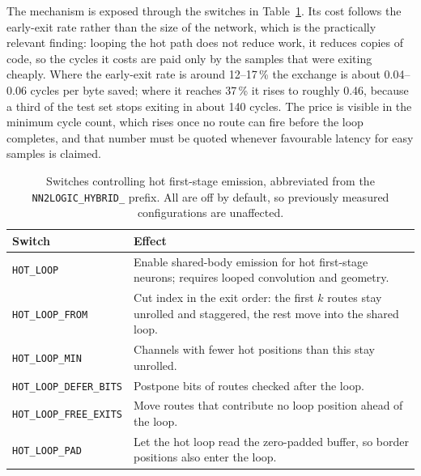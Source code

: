 The mechanism is exposed through the switches in Table~\ref{tab:impl-hotloop}.
Its cost follows the early-exit rate rather than the size of the network, which is the practically relevant finding: looping the hot path does not reduce work, it reduces copies of code, so the cycles it costs are paid only by the samples that were exiting cheaply.
Where the early-exit rate is around 12--17\,\% the exchange is about 0.04--0.06 cycles per byte saved; where it reaches 37\,\% it rises to roughly 0.46, because a third of the test set stops exiting in about 140 cycles.
The price is visible in the minimum cycle count, which rises once no route can fire before the loop completes, and that number must be quoted whenever favourable latency for easy samples is claimed.

\begin{table}[H]
	\centering
	\small
	\caption{Switches controlling hot first-stage emission, abbreviated from the \texttt{NN2LOGIC\_HYBRID\_} prefix.
		All are off by default, so previously measured configurations are unaffected.}
	\label{tab:impl-hotloop}
	\begin{tabularx}{\textwidth}{@{}>{\raggedright\arraybackslash}p{}X@{}}
		\toprule
		\textbf{Switch} & \textbf{Effect} \\
		\midrule
		\texttt{HOT\_LOOP} & Enable shared-body emission for hot first-stage neurons; requires looped convolution and geometry. \\
		\texttt{HOT\_LOOP\_FROM} & Cut index in the exit order: the first \(k\) routes stay unrolled and staggered, the rest move into the shared loop. \\
		\texttt{HOT\_LOOP\_MIN} & Channels with fewer hot positions than this stay unrolled. \\
		\texttt{HOT\_LOOP\_DEFER\_BITS} & Postpone bits of routes checked after the loop. \\
		\texttt{HOT\_LOOP\_FREE\_EXITS} & Move routes that contribute no loop position ahead of the loop. \\
		\texttt{HOT\_LOOP\_PAD} & Let the hot loop read the zero-padded buffer, so border positions also enter the loop. \\
		\bottomrule
	\end{tabularx}
\end{table}


